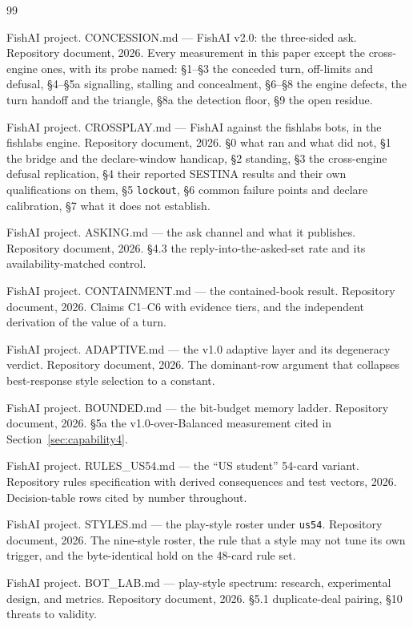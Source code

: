 \documentclass[11pt]{article}
\newcommand{\code}[1]{\texttt{#1}}
\newcommand{\usff}{\code{us54}}
\begin{document}
\begin{thebibliography}{99}
\footnotesize

FishAI project. CONCESSION.md --- FishAI v2.0: the three-sided ask. Repository document, 2026. Every
measurement in this paper except the cross-engine ones, with its probe named: \S1--\S3 the conceded
turn, off-limits and defusal, \S4--\S5a signalling, stalling and concealment, \S6--\S8 the engine
defects, the turn handoff and the triangle, \S8a the detection floor, \S9 the open residue.

FishAI project. CROSSPLAY.md --- FishAI against the fishlabs bots, in the fishlabs engine.
Repository document, 2026. \S0 what ran and what did not, \S1 the bridge and the declare-window
handicap, \S2 standing, \S3 the cross-engine defusal replication, \S4 their reported SESTINA
results and their own qualifications on them, \S5 \code{lockout}, \S6 common failure points and
declare calibration, \S7 what it does not establish.

FishAI project. ASKING.md --- the ask channel and what it publishes. Repository document, 2026.
\S4.3 the reply-into-the-asked-set rate and its availability-matched control.

FishAI project. CONTAINMENT.md --- the contained-book result. Repository document, 2026. Claims
C1--C6 with evidence tiers, and the independent derivation of the value of a turn.

FishAI project. ADAPTIVE.md --- the v1.0 adaptive layer and its degeneracy verdict. Repository
document, 2026. The dominant-row argument that collapses best-response style selection to a
constant.

FishAI project. BOUNDED.md --- the bit-budget memory ladder. Repository document, 2026. \S5a the
v1.0-over-Balanced measurement cited in Section~\ref{sec:capability4}.

FishAI project. RULES\_US54.md --- the ``US student'' 54-card variant. Repository rules
specification with derived consequences and test vectors, 2026. Decision-table rows cited by number
throughout.

FishAI project. STYLES.md --- the play-style roster under \usff{}. Repository document, 2026. The
nine-style roster, the rule that a style may not tune its own trigger, and the byte-identical hold
on the 48-card rule set.

FishAI project. BOT\_LAB.md --- play-style spectrum: research, experimental design, and metrics.
Repository document, 2026. \S5.1 duplicate-deal pairing, \S10 threats to validity.


\end{thebibliography}
\end{document}
